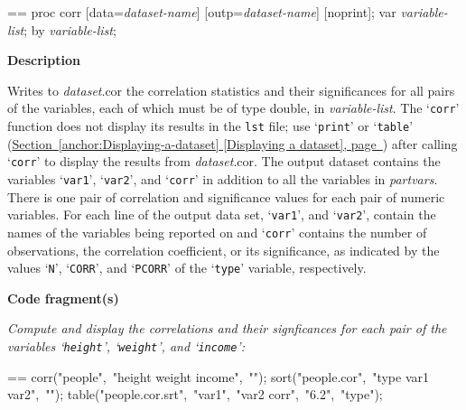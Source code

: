 \documentclass{book}
\makeatletter
\newcommand\Texinfocommandstyletextvar[1]{{\normalfont{}\textsl{#1}}}%
\newenvironment{Texinfopreformatted}{%
  \par\GNUTobeylines\obeyspaces\frenchspacing\parskip=\z@\parindent=\z@}{}
{\catcode`\^^M=13 \gdef\GNUTobeylines{\catcode`\^^M=13 \def^^M{\null\par}}}
\newenvironment{Texinfoindented}{\begin{list}{}{}\item\relax}{\end{list}}
\renewcommand{\_}{\Texinfounderscore\discretionary{}{}{}}
\makeatother
\begin{document}
\begin{Texinfoindented}
\begin{Texinfopreformatted}%
proc corr [data=\Texinfocommandstyletextvar{dataset-name}] [outp=\Texinfocommandstyletextvar{dataset-name}] [noprint];
var \Texinfocommandstyletextvar{variable-list};
by \Texinfocommandstyletextvar{variable-list};
\end{Texinfopreformatted}
\end{Texinfoindented}

%

\noindent{}\textbf{Description}

Writes to \Texinfocommandstyletextvar{dataset}.cor the correlation statistics and their significances for
all pairs of the variables, each of which must be of type double,
in \Texinfocommandstyletextvar{variable-list}.
The `\texttt{corr}' function does not display its results in the \texttt{lst} file; use
`\texttt{print}' or `\texttt{table}' (\hyperref[anchor:Displaying-a-dataset]{Section~\ref*{anchor:Displaying-a-dataset} [Displaying a dataset], page~\pageref*{anchor:Displaying-a-dataset}}) after calling
`\texttt{corr}' to display the results from \Texinfocommandstyletextvar{dataset}.cor.
The output dataset contains the variables `\texttt{\_var1\_}', `\texttt{\_var2\_}', and `\texttt{\_corr\_}'
\index[in]{\_var1\_@\_var1\_}%
\index[in]{\_var2\_@\_var2\_}%
\index[in]{\_corr\_@\_corr\_}%
in addition to all the variables in \Texinfocommandstyletextvar{partvars}.
There is one pair of correlation and significance
values for each pair of numeric variables.
For each line of the output data set,
`\texttt{\_var1\_}', and `\texttt{\_var2\_}', contain the names of the variables being
reported on and `\texttt{\_corr\_}'
contains the number of observations, the correlation coefficient, or its significance, as
indicated by the values `\texttt{N}',
`\texttt{CORR}', and `\texttt{PCORR}' of the `\texttt{\_type\_}' variable, respectively.

\noindent{}\textbf{Code fragment(s)}

\emph{Compute and display the correlations and their signficances for
each pair of the variables `\texttt{height}', `\texttt{weight}',
and `\texttt{income}':}
\begin{Texinfoindented}
\begin{Texinfopreformatted}%
\ttfamily corr("people",\ "height weight income",\ "");
sort("people.cor",\ "\_type\_ \_var1\_ \_var2\_",\ "");
table("people.cor.srt",\ "\_var1\_",\ "\_var2\_ \_corr\_",\ "6.2",\ "\_type\_");
\end{Texinfopreformatted}
\end{Texinfoindented}
%
%
\end{document}
